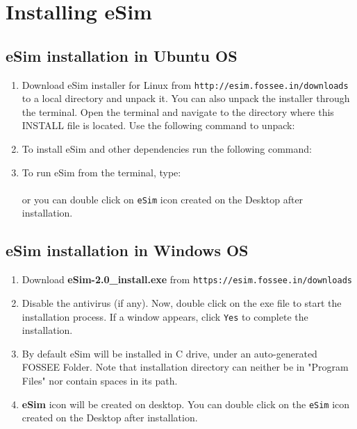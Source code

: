 \chapter{Installing eSim}
\thispagestyle{empty}
\label{chap3}

\section {eSim installation in Ubuntu OS}
\begin{enumerate}
\item Download eSim installer for Linux from {\tt http://esim.fossee.in/downloads} to a local directory and unpack it. You can also unpack the  installer through the terminal. Open the terminal and navigate to the directory where this INSTALL file is located. Use the following command to unpack:
\\
\item To install eSim and other dependencies run the following command:
\\
\item To run eSim from the terminal, type:  
\\
\\
  or you can double click on {\tt eSim} icon created on the Desktop after installation.
\end{enumerate}


\section {eSim installation in Windows OS}
\begin{enumerate}
\item Download \textbf{eSim-2.0\_install.exe} from  {\tt https://esim.fossee.in/downloads}
\item Disable the antivirus (if any). Now, double click on the exe file to start the installation process. If a window appears, click {\tt Yes} to complete the installation.
\item By default eSim will be installed in C drive, under an auto-generated FOSSEE Folder. Note that installation directory can neither be in "Program Files" nor contain spaces in its path.
\item \textbf{eSim} icon will be created on desktop. You can double click on the {\tt eSim} icon created on the Desktop after installation.
\end{enumerate}

